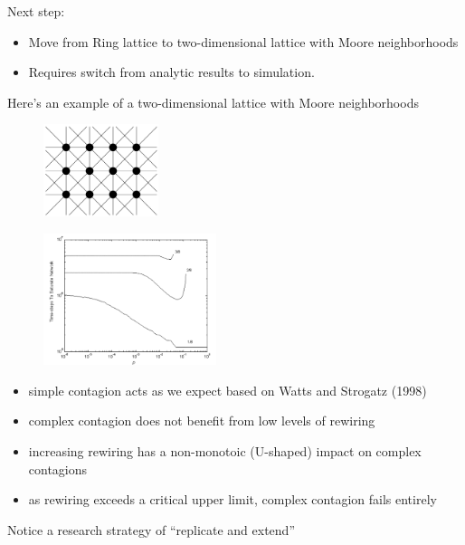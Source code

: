 \documentclass[aspectratio=169]{beamer}
\begin{document}
\begin{frame}

Next step: 
\begin{itemize}
\item Move from Ring lattice to two-dimensional lattice with Moore neighborhoods
\item Requires switch from analytic results to simulation.
\end{itemize}

\vfill
Here's an example of a two-dimensional lattice with Moore neighborhoods
\begin{figure}
\includegraphics[width=0.3\textwidth]{figures/neary_heterogenity_2017_fig4b}
\end{figure}

\end{frame}
\begin{frame}

\begin{figure}
\includegraphics[width=0.45\textwidth]{figures/centola_complex_2007_fig3}
\end{figure}

\pause
\begin{itemize}
\item simple contagion acts as we expect based on Watts and Strogatz (1998) \pause
\item complex contagion does not benefit from low levels of rewiring \pause
\item increasing rewiring has a non-monotoic (U-shaped) impact on complex contagions \pause
\item as rewiring exceeds a critical upper limit, complex contagion fails entirely \pause
\end{itemize}
\vfill
Notice a research strategy of ``replicate and extend''

\end{frame}
\end{document}
